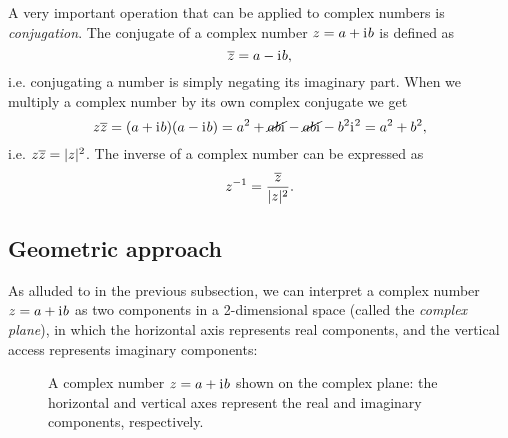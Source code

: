 A very important operation that can be applied to complex numbers is \emph{conjugation}. The conjugate of a complex number $z=a+\mathrm{i}\mkern1mu b$ is defined as
\begin{equation}
	\overline{z} = a-\mathrm{i}\mkern1mu b,
	\label{eq:complex_conjugation}
\end{equation}
i.e. conjugating a number is simply negating its imaginary part. When we multiply a complex number by its own complex conjugate we get
\begin{equation}
	z\overline{z} = (a+\mathrm{i}\mkern1mu b)(a-\mathrm{i}\mkern1mu b) = a^{2} + \cancel{ab\mathrm{i}\mkern1mu}  - \cancel{ab\mathrm{i}\mkern1mu}  - b^{2}\mathrm{i}\mkern1mu^{2} = a^{2}+b^{2},
	\label{eq:conjugate_product}
\end{equation}
i.e. $z\overline{z} = |z|^{2}$. The inverse of a complex number can be expressed as
\begin{equation}
	z^{-1} = \frac{\overline{z}}{|z|^{2}}.
	\label{eq:complex_inverse}
\end{equation}

\subsection{Geometric approach}
As alluded to in the previous subsection, we can interpret a complex number $z=a+\mathrm{i}\mkern1mu b$ as two components in a 2-dimensional space (called the \emph{complex plane}), in which the horizontal axis represents real components, and the vertical access represents imaginary components:
\begin{figure}
	\centering
	\caption{A complex number $z=a+\mathrm{i}\mkern1mu b$ shown on the complex plane: the horizontal and vertical axes represent the real and imaginary components, respectively.}
	\label{fig:complex number}
\end{figure}

